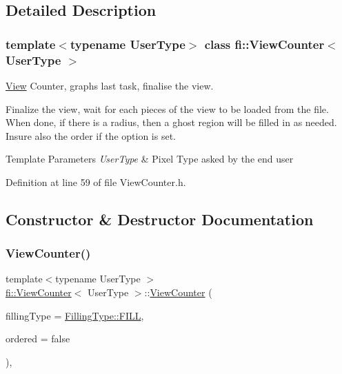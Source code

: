\subsection{Detailed Description}
\subsubsection*{template$<$typename User\+Type$>$\newline
class fi\+::\+View\+Counter$<$ User\+Type $>$}

\hyperlink{classfi_1_1View}{View} Counter, graph\textquotesingle{}s last task, finalise the view. 

Finalize the view, wait for each pieces of the view to be loaded from the file. When done, if there is a radius, then a ghost region will be filled in as needed. Insure also the order if the option is set.


\begin{DoxyTemplParams}{Template Parameters}
{\em User\+Type} & Pixel Type asked by the end user \\
\hline
\end{DoxyTemplParams}


Definition at line 59 of file View\+Counter.\+h.



\subsection{Constructor \& Destructor Documentation}
\mbox{\label{classfi_1_1ViewCounter_a91de9bc19ea0f0629ebb689ecae07f68}} 
\subsubsection{\texorpdfstring{View\+Counter()}{ViewCounter()}}
{\footnotesize\ttfamily template$<$typename User\+Type $>$ \\
\hyperlink{classfi_1_1ViewCounter}{fi\+::\+View\+Counter}$<$ User\+Type $>$\+::\hyperlink{classfi_1_1ViewCounter}{View\+Counter} (\begin{DoxyParamCaption}\item[{\hyperlink{namespacefi_a6808b618c85d179a330ca388162215bd}{Filling\+Type}}]{filling\+Type = {\ttfamily \hyperlink{namespacefi_a6808b618c85d179a330ca388162215bdae8225b11842409df543692aebed34fd1}{Filling\+Type\+::\+F\+I\+LL}},  }\item[{bool}]{ordered = {\ttfamily false} }\end{DoxyParamCaption})\hspace{0.3cm}{\ttfamily [inline]}, {\ttfamily [explicit]}}



